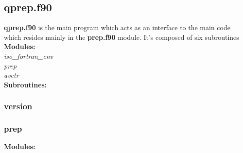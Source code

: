 \documentclass[10pt, oneside, pdftex]{article}
\begin{document}
\subsection{qprep.f90}

\textbf{qprep.f90} is the  main program which acts as  an interface to
the main  code which resides  mainly in the  \textbf{prep.f90} module.
It's composed of six subroutines\\



\textbf{Modules: }\\
\textit{iso\_fortran\_env}\\
\textit{prep}\\
\textit{avetr}\\


\textbf{Subroutines: }\\


\subsubsection{version} 
\subsubsection{prep}
\textbf{Modules: }\\
\textit{}

\end{document}
